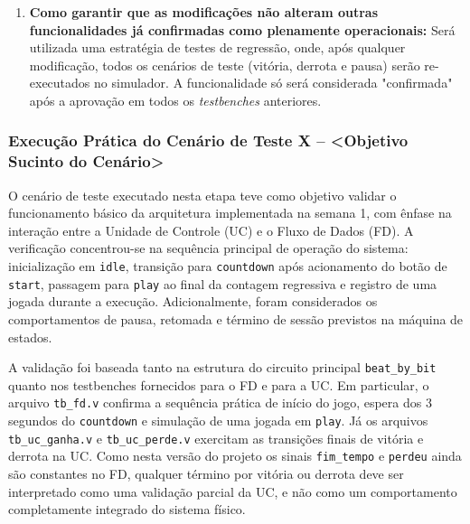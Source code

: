 \documentclass[a4paper,12pt,twoside]{article}
\begin{document}
\begin{enumerate}
  \item
    \textbf{Como garantir que as modificações não alteram outras funcionalidades já confirmadas como
  plenamente operacionais:}
    Será utilizada uma estratégia de testes de regressão, onde, após qualquer modificação, todos os cenários
  de teste (vitória, derrota e pausa) serão re-executados no simulador. A funcionalidade só será considerada
  "confirmada" após a aprovação em todos os \textit{testbenches} anteriores.
  \end{enumerate}




\subsubsection{Execução Prática do Cenário de Teste X --
\textless Objetivo Sucinto do
Cenário\textgreater{}}\label{execuuxe7uxe3o-pruxe1tica-do-cenuxe1rio-de-teste-x-objetivo-sucinto-do-cenuxe1rio}

O cenário de teste executado nesta etapa teve como objetivo validar o funcionamento básico da arquitetura implementada na semana 1, com ênfase na interação entre a Unidade de Controle (UC) e o Fluxo de Dados (FD). A verificação concentrou-se na sequência principal de operação do sistema: inicialização em \texttt{idle}, transição para \texttt{countdown} após acionamento do botão de \texttt{start}, passagem para \texttt{play} ao final da contagem regressiva e registro de uma jogada durante a execução. Adicionalmente, foram considerados os comportamentos de pausa, retomada e término de sessão previstos na máquina de estados.

A validação foi baseada tanto na estrutura do circuito principal \texttt{beat\_by\_bit} quanto nos testbenches fornecidos para o FD e para a UC. Em particular, o arquivo \texttt{tb\_fd.v} confirma a sequência prática de início do jogo, espera dos 3 segundos do \texttt{countdown} e simulação de uma jogada em \texttt{play}. Já os arquivos \texttt{tb\_uc\_ganha.v} e \texttt{tb\_uc\_perde.v} exercitam as transições finais de vitória e derrota na UC. Como nesta versão do projeto os sinais \texttt{fim\_tempo} e \texttt{perdeu} ainda são constantes no FD, qualquer término por vitória ou derrota deve ser interpretado como uma validação parcial da UC, e não como um comportamento completamente integrado do sistema físico.
\end{document}
